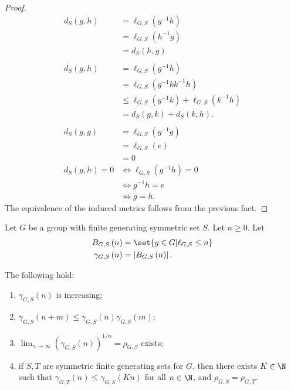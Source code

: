 \documentclass[10pt]{mypackage}
\begin{document}
\begin{proof}
  \begin{align*}
    d_S\left(g,h\right) &= \ell_{G,S}\left(g^{-1}h\right) \\
                        &= \ell_{G,S}\left(h^{-1}g\right)\\
                        &= d_S\left(h,g\right)\\
                        \\
    d_{S}\left(g,h\right) &= \ell_{G,S}\left(g^{-1}h\right)\\
                          &= \ell_{G,S}\left(g^{-1}kk^{-1}h\right)\\
                          &\leq \ell_{G,S}\left(g^{-1}k\right) + \ell_{G,S}\left(k^{-1}h\right)\\
                          &= d_{S}\left(g,k\right) + d_{S}\left(k,h\right).\\
                          \\
    d_{S}\left(g,g\right) &= \ell_{G,S}\left(g^{-1}g\right)\\
                          &= \ell_{G,S}\left(e\right)\\
                          &= 0\\
    d_S\left(g,h\right) = 0 &\Leftrightarrow \ell_{G,S}\left(g^{-1}h\right) = 0\\
                            &\Leftrightarrow g^{-1}h = e\\
                            &\Leftrightarrow g = h.
  \end{align*}
  The equivalence of the induced metrics follows from the previous fact.
\end{proof}
\begin{definition}
  Let $G$ be a group with finite generating symmetric set $S$. Let $n\geq 0$. Let
  \begin{align*}
    B_{G,S}\left(n\right) &= \set{g\in G | \ell_{G,S}\leq n}\\
    \gamma_{G,S}\left(n\right) &= \left\vert B_{G,S}\left(n\right) \right\vert.
  \end{align*}
\end{definition}
\begin{fact}
  The following hold:
  \begin{enumerate}[(1)]
    \item $\gamma_{G,S}\left(n\right)$ is increasing;
    \item $\gamma_{G,S}\left(n + m\right) \leq \gamma_{G,S}\left(n\right) \gamma_{G,S}\left(m\right)$;
    \item $\lim_{n\rightarrow\infty}\left(\gamma_{G,S}\left(n\right)\right)^{1/n} = \rho_{G,S}$ exists;
    \item if $S,T$ are symmetric finite generating sets for $G$, then there exists $K\in \N$ such that $\gamma_{G,T}\left(n\right) \leq \gamma_{G,S}\left(Kn\right)$ for all $n\in \N$, and $\rho_{G,S} = \rho_{G,T}$.
  \end{enumerate}
\end{fact}
\end{document}
